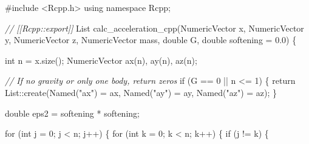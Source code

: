 \documentclass[
  10.5pt,
  letterpaper,
]{scrbook}
\newenvironment{Shaded}{\begin{snugshade}}{\end{snugshade}}
\newcommand{\CommentTok}[1]{\textcolor[rgb]{0.00,0.00,0.00}{\textit{#1}}}
\newcommand{\ControlFlowTok}[1]{\textcolor[rgb]{0.00,0.00,0.00}{#1}}
\newcommand{\DataTypeTok}[1]{\textcolor[rgb]{0.00,0.00,0.00}{#1}}
\newcommand{\DecValTok}[1]{\textcolor[rgb]{0.00,0.00,0.00}{#1}}
\newcommand{\FloatTok}[1]{\textcolor[rgb]{0.00,0.00,0.00}{#1}}
\newcommand{\ImportTok}[1]{\textcolor[rgb]{0.00,0.00,0.00}{#1}}
\newcommand{\KeywordTok}[1]{\textcolor[rgb]{0.00,0.00,0.00}{#1}}
\newcommand{\NormalTok}[1]{\textcolor[rgb]{0.00,0.00,0.00}{#1}}
\newcommand{\OperatorTok}[1]{\textcolor[rgb]{0.00,0.00,0.00}{#1}}
\newcommand{\PreprocessorTok}[1]{\textcolor[rgb]{0.00,0.00,0.00}{#1}}
\newcommand{\StringTok}[1]{\textcolor[rgb]{0.00,0.00,0.00}{#1}}
\theoremstyle{definition}
\theoremstyle{plain}
\theoremstyle{remark}
\begin{document}
\begin{Shaded}
\begin{Highlighting}[]
\PreprocessorTok{\#include }\ImportTok{\textless{}Rcpp.h\textgreater{}}
\KeywordTok{using} \KeywordTok{namespace}\NormalTok{ Rcpp}\OperatorTok{;}

\CommentTok{// [[Rcpp::export]]}
\NormalTok{List calc\_acceleration\_cpp}\OperatorTok{(}\NormalTok{NumericVector x}\OperatorTok{,}\NormalTok{ NumericVector y}\OperatorTok{,}\NormalTok{ NumericVector z}\OperatorTok{,}
\NormalTok{                           NumericVector mass}\OperatorTok{,} \DataTypeTok{double}\NormalTok{ G}\OperatorTok{,}
                           \DataTypeTok{double}\NormalTok{ softening }\OperatorTok{=} \FloatTok{0.0}\OperatorTok{)} \OperatorTok{\{}

  \DataTypeTok{int}\NormalTok{ n }\OperatorTok{=}\NormalTok{ x}\OperatorTok{.}\NormalTok{size}\OperatorTok{();}
\NormalTok{  NumericVector ax}\OperatorTok{(}\NormalTok{n}\OperatorTok{),}\NormalTok{ ay}\OperatorTok{(}\NormalTok{n}\OperatorTok{),}\NormalTok{ az}\OperatorTok{(}\NormalTok{n}\OperatorTok{);}

  \CommentTok{// If no gravity or only one body, return zeros}
  \ControlFlowTok{if} \OperatorTok{(}\NormalTok{G }\OperatorTok{==} \DecValTok{0} \OperatorTok{||}\NormalTok{ n }\OperatorTok{\textless{}=} \DecValTok{1}\OperatorTok{)} \OperatorTok{\{}
    \ControlFlowTok{return}\NormalTok{ List}\OperatorTok{::}\NormalTok{create}\OperatorTok{(}\NormalTok{Named}\OperatorTok{(}\StringTok{"ax"}\OperatorTok{)} \OperatorTok{=}\NormalTok{ ax}\OperatorTok{,}\NormalTok{ Named}\OperatorTok{(}\StringTok{"ay"}\OperatorTok{)} \OperatorTok{=}\NormalTok{ ay}\OperatorTok{,}\NormalTok{ Named}\OperatorTok{(}\StringTok{"az"}\OperatorTok{)} \OperatorTok{=}\NormalTok{ az}\OperatorTok{);}
  \OperatorTok{\}}

  \DataTypeTok{double}\NormalTok{ eps2 }\OperatorTok{=}\NormalTok{ softening }\OperatorTok{*}\NormalTok{ softening}\OperatorTok{;}

  \ControlFlowTok{for} \OperatorTok{(}\DataTypeTok{int}\NormalTok{ j }\OperatorTok{=} \DecValTok{0}\OperatorTok{;}\NormalTok{ j }\OperatorTok{\textless{}}\NormalTok{ n}\OperatorTok{;}\NormalTok{ j}\OperatorTok{++)} \OperatorTok{\{}
    \ControlFlowTok{for} \OperatorTok{(}\DataTypeTok{int}\NormalTok{ k }\OperatorTok{=} \DecValTok{0}\OperatorTok{;}\NormalTok{ k }\OperatorTok{\textless{}}\NormalTok{ n}\OperatorTok{;}\NormalTok{ k}\OperatorTok{++)} \OperatorTok{\{}
      \ControlFlowTok{if} \OperatorTok{(}\NormalTok{j }\OperatorTok{!=}\NormalTok{ k}\OperatorTok{)} \OperatorTok{\{}


\end{Highlighting}
\end{Shaded}
\end{document}
